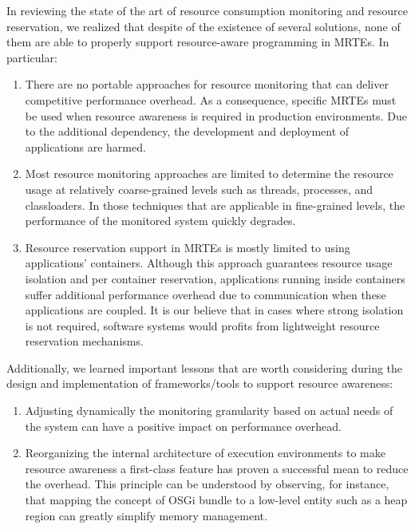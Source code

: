 In reviewing the state of the art of resource consumption monitoring and resource reservation, we realized that despite of the existence of several solutions, none of them are able to properly support resource-aware programming in MRTEs.
In particular:
\begin{enumerate}
\item There are no portable approaches for resource monitoring that can deliver competitive performance overhead.
As a consequence, specific MRTEs must be used when resource awareness is required in production environments.
Due to the additional dependency, the development and deployment of applications are harmed.

\item Most resource monitoring approaches are limited to determine the resource usage at relatively coarse-grained levels  such as threads, processes, and classloaders.
In those techniques that are applicable in fine-grained levels, the performance of the monitored system quickly degrades. 

\item Resource reservation support in MRTEs is mostly limited to using applications' containers.
Although this approach guarantees resource usage isolation and per container reservation, applications running inside containers suffer additional performance overhead due to communication when these applications are coupled.
It is our believe that in cases where strong isolation is not required, software systems would profits from lightweight resource reservation mechanisms. 
\end{enumerate}

Additionally, we learned important lessons that are worth considering during the design and implementation of frameworks/tools to support resource awareness:
\begin{enumerate}
\item Adjusting dynamically the monitoring granularity based on actual needs of the system can have
a positive impact on performance overhead.

\item Reorganizing the internal architecture of execution environments to make resource awareness a first-class feature has proven a successful mean to reduce the overhead.
This principle can be understood by observing, for instance, that mapping the concept of OSGi bundle to a low-level entity such as a heap region can greatly simplify memory management. 
\end{enumerate}


